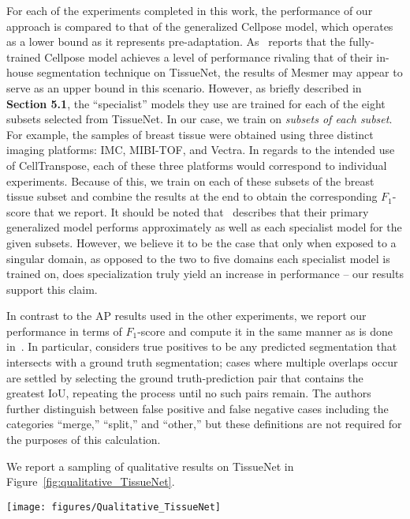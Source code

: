 For each of the experiments completed in this work, the performance of our approach is compared to that of the generalized Cellpose model, which operates as a lower bound as it represents pre-adaptation. As~\cite{Greenwald2021-uj} reports that the fully-trained Cellpose model achieves a level of performance rivaling that of their in-house segmentation technique on TissueNet, the results of Mesmer may appear to serve as an upper bound in this scenario. However, as briefly described in \textbf{Section 5.1}, the ``specialist'' models they use are trained for each of the eight subsets selected from TissueNet. In our case, we train on \emph{subsets of each subset}. For example, the samples of breast tissue were obtained using three distinct imaging platforms: IMC, MIBI-TOF, and Vectra. In regards to the intended use of CellTranspose, each of these three platforms would correspond to individual experiments. Because of this, we train on each of these subsets of the breast tissue subset and combine the results at the end to obtain the corresponding $F_1$-score that we report. It should be noted that~\cite{Greenwald2021-uj} describes that their primary generalized model performs approximately as well as each specialist model for the given subsets. However, we believe it to be the case that only when exposed to a singular domain, as opposed to the two to five domains each specialist model is trained on, does specialization truly yield an increase in performance -- our results support this claim.

In contrast to the AP results used in the other experiments, we report our performance in terms of $F_1$-score and compute it in the same manner as is done in~\cite{Greenwald2021-uj}. In particular, \cite{Greenwald2021-uj} considers true positives to be any predicted segmentation that intersects with a ground truth segmentation; cases where multiple overlaps occur are settled by selecting the ground truth-prediction pair that contains the greatest IoU, repeating the process until no such pairs remain. The authors further distinguish between false positive and false negative cases including the categories ``merge,'' ``split,'' and ``other,'' but these definitions are not required for the purposes of this calculation.

We report a sampling of qualitative results on TissueNet in Figure~\ref{fig:qualitative_TissueNet}.

\begin{figure*}
\centering
\texttt{[image: figures/Qualitative\_TissueNet]}
\caption{\textbf{Qualitative results on images from the \emph{TissueNet} dataset.} Samples were selected such that all four most common tissue types as well as all four most common imaging types were represented. Segmentations in each sample are shown in gray with cell borders shown in blue}
\label{fig:qualitative_TissueNet}
\end{figure*}

